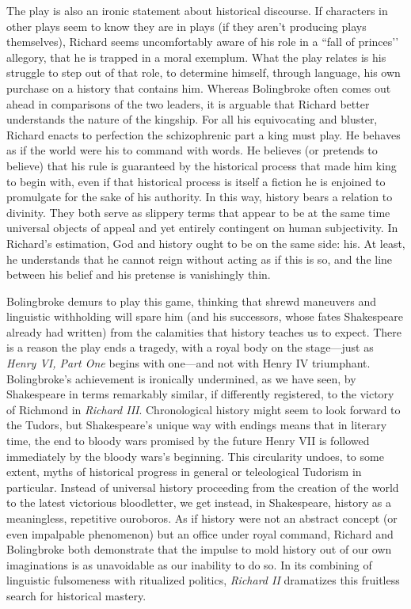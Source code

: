 The play is also an ironic statement about historical discourse.
If characters in other plays seem to know they are in plays (if they aren’t producing plays themselves), Richard seems uncomfortably aware of his role in a ``fall of princes’’ allegory, that he is trapped in a moral exemplum.
What the play relates is his struggle to step out of that role, to determine himself, through language, his own purchase on a history that contains him.
Whereas Bolingbroke often comes out ahead in comparisons of the two leaders, it is arguable that Richard better understands the nature of the kingship.
For all his equivocating and bluster, Richard enacts to perfection the schizophrenic part a king must play.
He behaves as if the world were his to command with words.
He believes (or pretends to believe) that his rule is guaranteed by the historical process that made him king to begin with, even if that historical process is itself a fiction he is enjoined to promulgate for the sake of his authority.
In this way, history bears a relation to divinity.
They both serve as slippery terms that appear to be at the same time universal objects of appeal and yet entirely contingent on human subjectivity.
In Richard’s estimation, God and history ought to be on the same side: his.
At least, he understands that he cannot reign without acting as if this is so, and the line between his belief and his pretense is vanishingly thin.

Bolingbroke demurs to play this game, thinking that shrewd maneuvers and linguistic withholding will spare him (and his successors, whose fates Shakespeare already had written) from the calamities that history teaches us to expect.
There is a reason the play ends a tragedy, with a royal body on the stage---just as \emph{Henry VI, Part One} begins with one---and not with Henry IV triumphant.
Bolingbroke’s achievement is ironically undermined, as we have seen, by Shakespeare in terms remarkably similar, if differently registered, to the victory of Richmond in \emph{Richard III}.
Chronological history might seem to look forward to the Tudors, but Shakespeare’s unique way with endings means that in literary time, the end to bloody wars promised by the future Henry VII is followed immediately by the bloody wars’s beginning.
This circularity undoes, to some extent, myths of historical progress in general or teleological Tudorism in particular.
Instead of universal history proceeding from the creation of the world to the latest victorious bloodletter, we get instead, in Shakespeare, history as a meaningless, repetitive ouroboros.
As if history were not an abstract concept (or even impalpable phenomenon) but an office under royal command, Richard and Bolingbroke both demonstrate that the impulse to mold history out of our own imaginations is as unavoidable as our inability to do so.
In its combining of linguistic fulsomeness with ritualized politics, \emph{Richard II} dramatizes this fruitless search for historical mastery.

